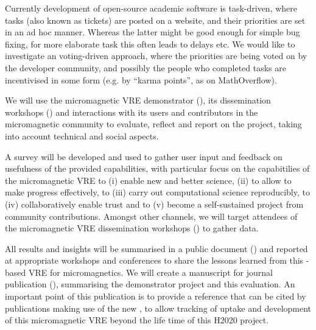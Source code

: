 \begin{workpackage}[id=social-aspects,wphases=0-48,
  title=Social Aspects,
  lead=UO,
  UORM=53,USHRM=8, USORM=6]
\begin{tasklist}
\begin{task}[title=Collective decision making in development,id=decisionmaking]
Currently development of open-source academic software is task-driven, where tasks (also
known as tickets) are posted on a website, and their priorities are set in an ad hoc manner.
Whereas the latter might be good enough for simple bug fixing, for more elaborate task this
often leads to delays etc.
We would like to investigate an voting-driven approach, where the priorities are being
voted on by the developer community, and possibly the people who completed tasks
are incentivised in some form (e.g. by ``karma points'', as on MathOverflow).
\end{task}

\begin{task}[title=Evaluation of Micromagnetic VRE,lead=USO,PM=6]
  We will use the micromagnetic VRE demonstrator
  (), its dissemination
  workshops \linebreak()
  and interactions with its users and contributors in the
  micromagnetic community to evaluate, reflect and report on the project,
  taking into account technical and social aspects.

  A survey will be developed and used to gather user input and
  feedback on usefulness of the provided capabilities, with particular
  focus on the capabitilies of the micromagnetic VRE to (i) enable new
  and better science, (ii) to allow to make progress effectively, to
  (iii) carry out computational science reproducibly, to (iv)
  collaboratively enable trust and to (v) become a self-sustained
  project from community contributions. Amongst other channels, we
  will target attendees of the micromagnetic VRE dissemination
  workshops () to
  gather data.

  All results and insights will be summarised in a public document
  () and reported at appropriate
  workshops and conferences to share the lessons learned from this
  \Jupyter-based VRE for micromagnetics. We will create a manuscript
  for journal publication (),
  summarising the demonstrator project and this evaluation. An
  important point of this publication is to provide a reference that
  can be cited by publications making use of the new \OOMMFNB, to
  allow tracking of uptake and development of this micromagnetic VRE beyond the life
  time of this H2020 project.
\end{task}




\end{tasklist}
\end{workpackage}

